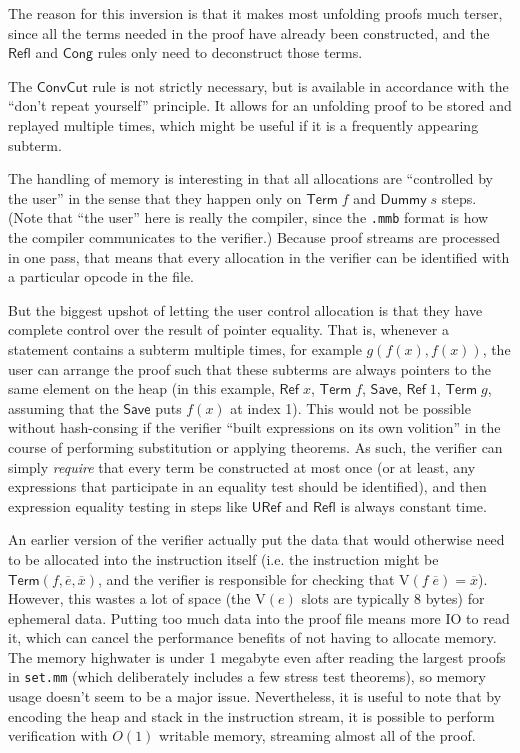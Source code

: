 \documentclass[runningheads]{llncs}
\begin{document}
The reason for this inversion is that it makes most unfolding proofs much terser, since all the terms needed in the proof have already been constructed, and the $\mathsf{Refl}$ and $\mathsf{Cong}$ rules only need to deconstruct those terms.

The $\mathsf{ConvCut}$ rule is not strictly necessary, but is available in accordance with the ``don't repeat yourself'' principle. It allows for an unfolding proof to be stored and replayed multiple times, which might be useful if it is a frequently appearing subterm.

The handling of memory is interesting in that all allocations are ``controlled by the user'' in the sense that they happen only on $\mathsf{Term}\;f$ and $\mathsf{Dummy}\;s$ steps.  (Note that ``the user'' here is really the compiler, since the \texttt{.mmb} format is how the compiler communicates to the verifier.) Because proof streams are processed in one pass, that means that every allocation in the verifier can be identified with a particular opcode in the file.

But the biggest upshot of letting the user control allocation is that they have complete control over the result of pointer equality. That is, whenever a statement contains a subterm multiple times, for example $g(f(x),f(x))$, the user can arrange the proof such that these subterms are always pointers to the same element on the heap (in this example, $\mathsf{Ref}\;x$, $\mathsf{Term}\;f$, $\mathsf{Save}$, $ \mathsf{Ref}\;1$, $\mathsf{Term}\;g$, assuming that the $\mathsf{Save}$ puts $f(x)$ at index 1). This would not be possible without hash-consing if the verifier ``built expressions on its own volition'' in the course of performing substitution or applying theorems. As such, the verifier can simply \emph{require} that every term be constructed at most once (or at least, any expressions that participate in an equality test should be identified), and then expression equality testing in steps like $\mathsf{URef}$ and $\mathsf{Refl}$ is always constant time.

An earlier version of the verifier actually put the data that would otherwise need to be allocated into the instruction itself (i.e. the instruction might be $\mathsf{Term}(f,\overline{e},\overline{x})$, and the verifier is responsible for checking that $\mathrm{V}(f\;\overline{e})=\overline{x}$). However, this wastes a lot of space (the $\mathrm{V}(e)$ slots are typically 8 bytes) for ephemeral data. Putting too much data into the proof file means more IO to read it, which can cancel the performance benefits of not having to allocate memory. The memory highwater is under 1 megabyte even after reading the largest proofs in \texttt{set.mm} (which deliberately includes a few stress test theorems), so memory usage doesn't seem to be a major issue. Nevertheless, it is useful to note that by encoding the heap and stack in the instruction stream, it is possible to perform verification with $O(1)$ writable memory, streaming almost all of the proof.
\end{document}
